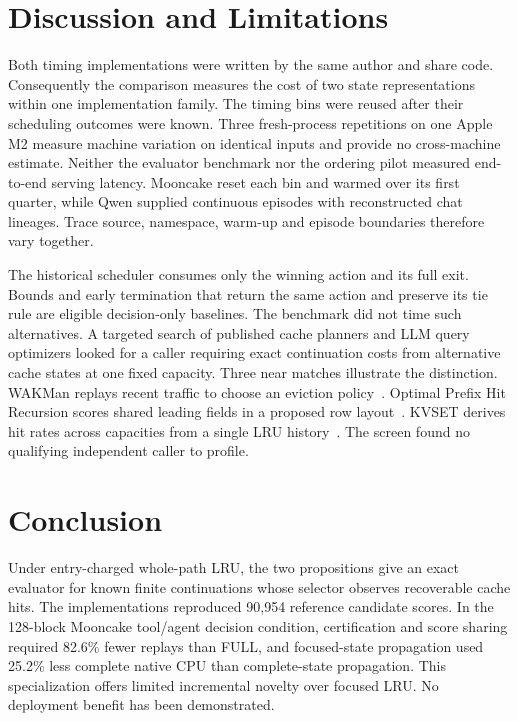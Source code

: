 \documentclass[11pt,letterpaper]{article}
\begin{document}
\section{Discussion and Limitations}

Both timing implementations were written by the same author and share code. Consequently the comparison measures the cost of two state representations within one implementation family. The timing bins were reused after their scheduling outcomes were known. Three fresh-process repetitions on one Apple M2 measure machine variation on identical inputs and provide no cross-machine estimate. Neither the evaluator benchmark nor the ordering pilot measured end-to-end serving latency. Mooncake reset each bin and warmed over its first quarter, while Qwen supplied continuous episodes with reconstructed chat lineages. Trace source, namespace, warm-up and episode boundaries therefore vary together.

The historical scheduler consumes only the winning action and its full exit. Bounds and early termination that return the same action and preserve its tie rule are eligible decision-only baselines. The benchmark did not time such alternatives. A targeted search of published cache planners and LLM query optimizers looked for a caller requiring exact continuation costs from alternative cache states at one fixed capacity. Three near matches illustrate the distinction. WAKMan replays recent traffic to choose an eviction policy~\cite{wakman}. Optimal Prefix Hit Recursion scores shared leading fields in a proposed row layout~\cite{liu}. KVSET derives hit rates across capacities from a single LRU history~\cite{kvset}. The screen found no qualifying independent caller to profile.

\section{Conclusion}

Under entry-charged whole-path LRU, the two propositions give an exact evaluator for known finite continuations whose selector observes recoverable cache hits. The implementations reproduced 90,954 reference candidate scores. In the 128-block Mooncake tool/agent decision condition, certification and score sharing required 82.6\% fewer replays than FULL, and focused-state propagation used 25.2\% less complete native CPU than complete-state propagation. This specialization offers limited incremental novelty over focused LRU. No deployment benefit has been demonstrated.
\end{document}
